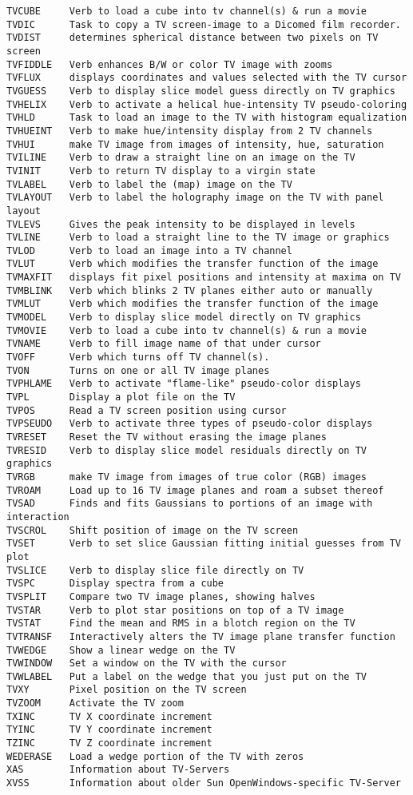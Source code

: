 \begin{verbatim}
TVCUBE     Verb to load a cube into tv channel(s) & run a movie
TVDIC      Task to copy a TV screen-image to a Dicomed film recorder.
TVDIST     determines spherical distance between two pixels on TV screen
TVFIDDLE   Verb enhances B/W or color TV image with zooms
TVFLUX     displays coordinates and values selected with the TV cursor
TVGUESS    Verb to display slice model guess directly on TV graphics
TVHELIX    Verb to activate a helical hue-intensity TV pseudo-coloring
TVHLD      Task to load an image to the TV with histogram equalization
TVHUEINT   Verb to make hue/intensity display from 2 TV channels
TVHUI      make TV image from images of intensity, hue, saturation
TVILINE    Verb to draw a straight line on an image on the TV
TVINIT     Verb to return TV display to a virgin state
TVLABEL    Verb to label the (map) image on the TV
TVLAYOUT   Verb to label the holography image on the TV with panel layout
TVLEVS     Gives the peak intensity to be displayed in levels
TVLINE     Verb to load a straight line to the TV image or graphics
TVLOD      Verb to load an image into a TV channel
TVLUT      Verb which modifies the transfer function of the image
TVMAXFIT   displays fit pixel positions and intensity at maxima on TV
TVMBLINK   Verb which blinks 2 TV planes either auto or manually
TVMLUT     Verb which modifies the transfer function of the image
TVMODEL    Verb to display slice model directly on TV graphics
TVMOVIE    Verb to load a cube into tv channel(s) & run a movie
TVNAME     Verb to fill image name of that under cursor
TVOFF      Verb which turns off TV channel(s).
TVON       Turns on one or all TV image planes
TVPHLAME   Verb to activate "flame-like" pseudo-color displays
TVPL       Display a plot file on the TV
TVPOS      Read a TV screen position using cursor
TVPSEUDO   Verb to activate three types of pseudo-color displays
TVRESET    Reset the TV without erasing the image planes
TVRESID    Verb to display slice model residuals directly on TV graphics
TVRGB      make TV image from images of true color (RGB) images
TVROAM     Load up to 16 TV image planes and roam a subset thereof
TVSAD      Finds and fits Gaussians to portions of an image with interaction
TVSCROL    Shift position of image on the TV screen
TVSET      Verb to set slice Gaussian fitting initial guesses from TV plot
TVSLICE    Verb to display slice file directly on TV
TVSPC      Display spectra from a cube
TVSPLIT    Compare two TV image planes, showing halves
TVSTAR     Verb to plot star positions on top of a TV image
TVSTAT     Find the mean and RMS in a blotch region on the TV
TVTRANSF   Interactively alters the TV image plane transfer function
TVWEDGE    Show a linear wedge on the TV
TVWINDOW   Set a window on the TV with the cursor
TVWLABEL   Put a label on the wedge that you just put on the TV
TVXY       Pixel position on the TV screen
TVZOOM     Activate the TV zoom
TXINC      TV X coordinate increment
TYINC      TV Y coordinate increment
TZINC      TV Z coordinate increment
WEDERASE   Load a wedge portion of the TV with zeros
XAS        Information about TV-Servers
XVSS       Information about older Sun OpenWindows-specific TV-Server
\end{verbatim}\eve

